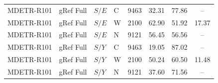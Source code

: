 \begin{table}[t]
\begin{tabular}{@{}llllcccc@{}}
MDETR-R101 & gRef Full & $S/E$ & C & 9463 & 32.31 & 77.86 & --\\
MDETR-R101 & gRef Full & $S/E$ & W & 2100 & 62.90 & 51.92 & 17.37\\
MDETR-R101 & gRef Full & $S/E$ & N & 9121 & 56.45 & 56.56 & --\\
MDETR-R101 & gRef Full & $S/Y$ & C & 9463 & 19.05 & 87.02 & --\\
MDETR-R101 & gRef Full & $S/Y$ & W & 2100 & 50.24 & 60.50 & 11.48\\
MDETR-R101 & gRef Full & $S/Y$ & N & 9121 & 37.60 & 71.56 & --\\
\bottomrule\end{tabular}
\end{table}
